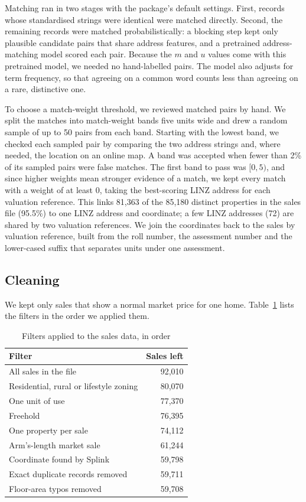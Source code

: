 \documentclass[conference]{IEEEtran}
\begin{document}
Matching ran in two stages with the package's default settings. First,
records whose standardised strings were identical were matched directly.
Second, the remaining records were matched probabilistically: a blocking
step kept only plausible candidate pairs that share address features,
and a pretrained address-matching model scored each pair. Because the
$m$ and $u$ values come with this pretrained model, we needed no
hand-labelled pairs. The model also adjusts for term frequency, so that
agreeing on a common word counts less than agreeing on a rare,
distinctive one.

To choose a match-weight threshold, we reviewed matched pairs by hand.
We split the matches into match-weight bands five units wide and drew a
random sample of up to 50 pairs from each band. Starting with the
lowest band, we checked each sampled pair by comparing the two address
strings and, where needed, the location on an online map. A band was
accepted when fewer than 2\% of its sampled pairs were false matches.
The first band to pass was $[0, 5)$, and since higher weights mean
stronger evidence of a match, we kept every match with a weight of at
least 0, taking the best-scoring LINZ address for each valuation
reference. This links 81,363 of the 85,180 distinct properties in the sales file
(95.5\%) to one LINZ address and coordinate; a few LINZ addresses (72)
are shared by two valuation references. We join the coordinates back to the sales by
valuation reference, built from the roll number, the assessment number
and the lower-cased suffix that separates units under one assessment.

\subsection{Cleaning}\label{sec:cleaning}
We kept only sales that show a normal market price for one home.
Table~\ref{tab:funnel} lists the filters in the order we applied them.

\begin{table}[t]
  \centering
  \caption{Filters applied to the sales data, in order}
  \label{tab:funnel}
  \begin{tabular}{@{}lr@{}}
    \toprule
    Filter & Sales left \\
    \midrule
    All sales in the file                  & 92,010 \\
    Residential, rural or lifestyle zoning & 80,070 \\
    One unit of use                        & 77,370 \\
    Freehold                               & 76,395 \\
    One property per sale                  & 74,112 \\
    Arm's-length market sale               & 61,244 \\
    Coordinate found by Splink             & 59,798 \\
    Exact duplicate records removed        & 59,711 \\
    Floor-area typos removed               & 59,708 \\
    \bottomrule
  \end{tabular}
\end{table}
\end{document}
